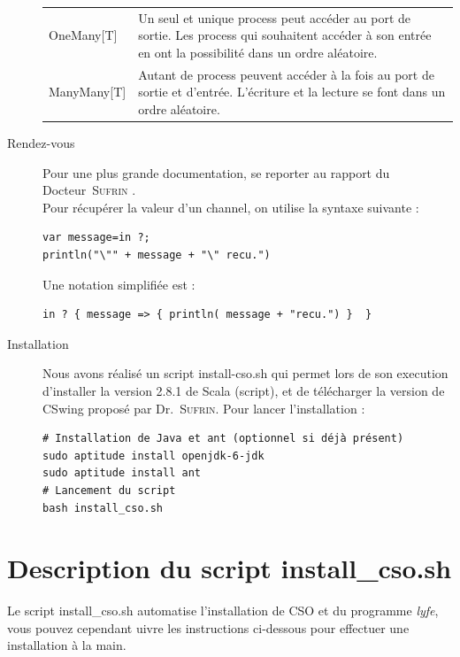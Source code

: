 \documentclass[a4paper,11pt,french]{report}
\begin{document}
\begin{description}
\begin{center}
\begin{tabular}{lp{}}
\textsf{OneMany[T]} & Un seul et unique process peut accéder au port de sortie. Les process qui souhaitent accéder à son entrée en ont la possibilité dans un ordre aléatoire.\\

\textsf{ManyMany[T]} & Autant de process peuvent accéder à la fois au port de sortie et d'entrée. L'écriture et la lecture se font dans un ordre aléatoire.\\
\end{tabular}
\end{center}

\item[Rendez-vous] Pour une plus grande documentation, se reporter au rapport du Docteur~\textsc{Sufrin} \cite{cpa2008-cso}.\\ 
Pour récupérer la valeur d'un \textsf{channel}, on utilise la syntaxe suivante :
\begin{verbatim}
var message=in ?; 
println("\"" + message + "\" recu.")
\end{verbatim}

Une notation simplifiée est :
\begin{verbatim}
in ? { message => { println( message + "recu.") }  }
\end{verbatim}             

\item[Installation] Nous avons réalisé un script \textsf{install-cso.sh} qui permet lors de son execution d'installer la version 2.8.1 de Scala (script), et de télécharger la version de CSwing proposé par Dr.\ \textsc{Sufrin}. Pour lancer l'installation :
\begin{verbatim}
# Installation de Java et ant (optionnel si déjà présent)
sudo aptitude install openjdk-6-jdk
sudo aptitude install ant
# Lancement du script
bash install_cso.sh
\end{verbatim}
\end{description}


\section{Description du script install\_{}cso.sh}
Le script install\_{}cso.sh automatise l'installation de CSO et du programme \emph{lyfe}, vous pouvez cependant uivre les instructions ci-dessous pour effectuer une \og installation à la main\fg.
\end{document}
